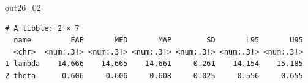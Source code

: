 \begin{MCMCout}{}{out26_02}
	\begin{verbatim}
# A tibble: 2 × 7
  name         EAP       MED       MAP        SD       L95       U95
  <chr>  <num:.3!> <num:.3!> <num:.3!> <num:.3!> <num:.3!> <num:.3!>
1 lambda    14.666    14.665    14.661     0.261    14.154    15.185
2 theta      0.606     0.606     0.608     0.025     0.556     0.655
\end{verbatim}
\end{MCMCout}
